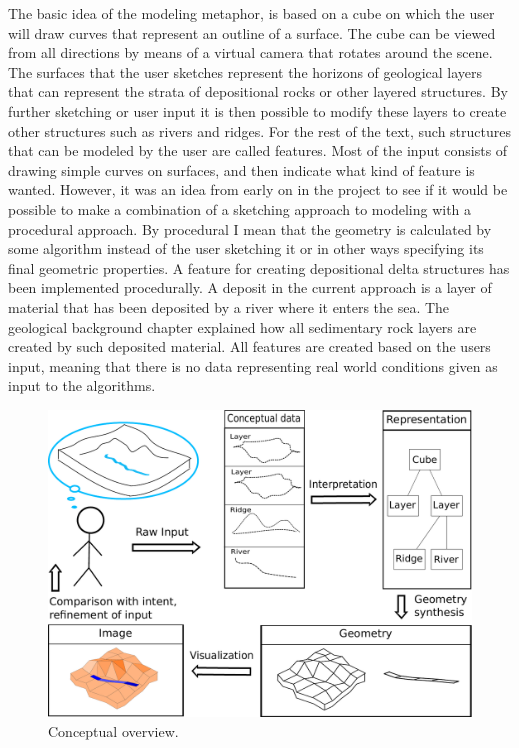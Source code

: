 \documentclass[a4paper,12pt]{report}
\begin{document}
The basic idea of the modeling metaphor, is based on a cube on which the user will draw curves that represent an outline of a surface. The cube can be viewed from all directions by means of a virtual camera that rotates around the scene. The surfaces that the user sketches represent the horizons of geological layers that can represent the strata of depositional rocks or other layered structures. By further sketching or user input it is then possible to modify these layers to create other structures such as rivers and ridges. For the rest of the text, such structures that can be modeled by the user are called features. Most of the input consists of drawing simple curves on surfaces, and then indicate what kind of feature is wanted. However, it was an idea from early on in the project to see if it would be possible to make a combination of a sketching approach to modeling with a procedural approach. By procedural I mean that the geometry is calculated by some algorithm instead of the user sketching it or in other ways specifying its final 
geometric properties. A feature for creating depositional delta structures has been implemented procedurally. A deposit in the current approach is a layer of material that has been deposited by a river where it enters the sea. The geological background chapter explained how all sedimentary rock layers are created by such deposited material. All features are created based on the users input, meaning that there is no data representing real world conditions given as input to the algorithms.
\begin{figure}[t]
 \includegraphics[width=\linewidth]{thesis/overviewConcept.pdf}
 \caption{Conceptual overview.}
 \label{fig:overviewConcept}
\end{figure}
\end{document}
